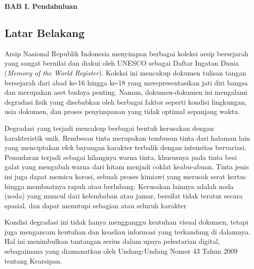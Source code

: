 

\vspace{2cm}
\begin{center}
{\fontsize{14}{16.8}\selectfont\textbf{BAB I. Pendahuluan}}\\[1em]
\end{center}
\label{sec:pendahuluan}
\setcounter{section}{1}
\setcounter{subsection}{0}
\vspace{2em}
\subsection{Latar Belakang}
\label{subsec:latar-belakang}
\vspace{0.8em}
Arsip Nasional Republik Indonesia menyimpan berbagai koleksi arsip bersejarah yang sangat bernilai dan diakui oleh UNESCO sebagai Daftar Ingatan Dunia (\textit{Memory of the World Register}). Koleksi ini mencakup dokumen tulisan tangan bersejarah dari abad ke-16 hingga ke-18 yang merepresentasikan jati diri bangsa dan merupakan aset budaya penting. Namun, dokumen-dokumen ini mengalami degradasi fisik yang disebabkan oleh berbagai faktor seperti kondisi lingkungan, usia dokumen, dan proses penyimpanan yang tidak optimal sepanjang waktu.


\vspace{0.8em}
Degradasi yang terjadi mencakup berbagai bentuk kerusakan dengan karakteristik unik. Rembesan tinta merupakan tembusan tinta dari halaman lain yang menciptakan efek bayangan karakter terbalik dengan intensitas bervariasi. Pemudaran terjadi sebagai hilangnya warna tinta, khususnya pada tinta besi galat yang mengubah warna dari hitam menjadi coklat keabu-abuan. Tinta jenis ini juga dapat memicu korosi, sebuah proses kimiawi yang merusak serat kertas hingga membuatnya rapuh atau berlubang. Kerusakan lainnya adalah noda (noda) yang muncul dari kelembaban atau jamur, bersifat tidak teratur secara spasial, dan dapat menutupi sebagian atau seluruh karakter

\vspace{0.8em}
Kondisi degradasi ini tidak hanya mengganggu keutuhan visual dokumen, tetapi juga mengancam keutuhan dan keaslian informasi yang terkandung di dalamnya. Hal ini menimbulkan tantangan serius dalam upaya pelestarian digital, sebagaimana yang diamanatkan oleh Undang-Undang Nomor 43 Tahun 2009 tentang Kearsipan.

